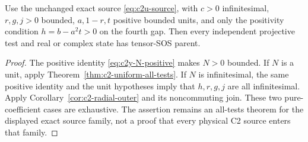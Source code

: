 \begin{corollary}
\label{cor:c2-bounded-shape-all-tests}
Use the unchanged exact source \eqref{eq:c2u-source}, with $c>0$
infinitesimal, $r,g,j>0$ bounded, $a,1-r,t$ positive bounded units,
and only the positivity condition $h=b-a^2t>0$ on the fourth gap.
Then every independent projective test and real or complex state has
tensor-SOS parent.
\end{corollary}
\begin{proof}
The positive identity \eqref{eq:c2y-N-positive} makes $N>0$ bounded.
If $N$ is a unit, apply Theorem~\ref{thm:c2-uniform-all-tests}.
If $N$ is infinitesimal, the same positive identity and the unit
hypotheses imply that $h,r,g,j$ are all infinitesimal.  Apply
Corollary~\ref{cor:c2-radial-outer} and its noncommuting join.
These two pure-coefficient cases are exhaustive.  The assertion remains
an all-tests theorem for the displayed exact source family, not a
proof that every physical C2 source enters that family.
\end{proof}
